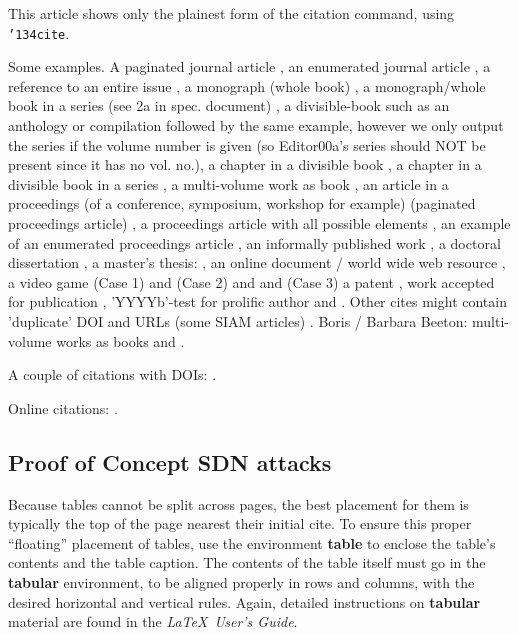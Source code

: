 This article shows only the plainest form
of the citation command, using \texttt{{\char'134}cite}.

Some examples.  A paginated journal article \cite{Abril07}, an enumerated
journal article \cite{Cohen07}, a reference to an entire issue \cite{JCohen96},
a monograph (whole book) \cite{Kosiur01}, a monograph/whole book in a series (see 2a in spec. document)
\cite{Harel79}, a divisible-book such as an anthology or compilation \cite{Editor00}
followed by the same example, however we only output the series if the volume number is given
\cite{Editor00a} (so Editor00a's series should NOT be present since it has no vol. no.),
a chapter in a divisible book \cite{Spector90}, a chapter in a divisible book
in a series \cite{Douglass98}, a multi-volume work as book \cite{Knuth97},
an article in a proceedings (of a conference, symposium, workshop for example)
(paginated proceedings article) \cite{Andler79}, a proceedings article
with all possible elements \cite{Smith10}, an example of an enumerated
proceedings article \cite{VanGundy07},
an informally published work \cite{Harel78}, a doctoral dissertation \cite{Clarkson85},
a master's thesis: \cite{anisi03}, an online document / world wide web
resource \cite{Thornburg01, Ablamowicz07, Poker06}, a video game (Case 1) \cite{Obama08} and (Case 2) \cite{Novak03}
and \cite{Lee05} and (Case 3) a patent \cite{JoeScientist001},
work accepted for publication \cite{rous08}, 'YYYYb'-test for prolific author
\cite{SaeediMEJ10} and \cite{SaeediJETC10}. Other cites might contain
'duplicate' DOI and URLs (some SIAM articles) \cite{Kirschmer:2010:AEI:1958016.1958018}.
Boris / Barbara Beeton: multi-volume works as books
\cite{MR781536} and \cite{MR781537}.

A couple of citations with DOIs: \cite{2004:ITE:1009386.1010128,
  Kirschmer:2010:AEI:1958016.1958018}. 

Online citations: \cite{TUGInstmem, Thornburg01, CTANacmart}.  


\subsection{Proof of Concept SDN attacks}
Because tables cannot be split across pages, the best
placement for them is typically the top of the page
nearest their initial cite.  To
ensure this proper ``floating'' placement of tables, use the
environment \textbf{table} to enclose the table's contents and
the table caption.  The contents of the table itself must go
in the \textbf{tabular} environment, to
be aligned properly in rows and columns, with the desired
horizontal and vertical rules.  Again, detailed instructions
on \textbf{tabular} material
are found in the \textit{\LaTeX\ User's Guide}.


